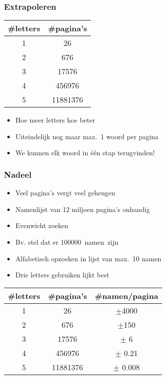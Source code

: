 \documentclass[dutch]{ucll-slides}
\begin{document}
\begin{frame}
  \frametitle{Extrapoleren}
  \begin{center}
    \begin{tabular}{cc}
      \bfseries \#letters & \bfseries \#pagina's \\
      \toprule
      1 & 26 \\
      2 & 676 \\
      3 & \SI{17576}{} \\
      4 & \SI{456976}{} \\
      5 & \SI{11881376}{} \\
    \end{tabular}
  \end{center}
  \begin{itemize}
    \item Hoe meer letters hoe beter
    \item Uiteindelijk nog maar max.~1 woord per pagina
    \item We kunnen elk woord in \'e\'en stap terugvinden!
  \end{itemize}
\end{frame}

\begin{frame}
  \frametitle{Nadeel}
  \begin{itemize}
    \item Veel pagina's vergt veel geheugen
    \item Namenlijst van 12 miljoen pagina's onhandig
    \item Evenwicht zoeken
    \item Bv. stel dat er \SI{100000} namen zijn
    \item Alfabetisch opzoeken in lijst van max.\ 10 namen
    \item Drie letters gebruiken lijkt best
  \end{itemize}
  \begin{center}
    \begin{tabular}{ccc}
      \bfseries\#letters & \bfseries\#pagina's & \bfseries\#namen/pagina \\
      \toprule
      1 & 26 & $\pm$4000 \\
      2 & 676 & $\pm$150 \\
      \color{red} 3 & \color{red} \SI{17576}{} & \color{red} $\pm$ 6 \\
      4 & \SI{456976}{} & $\pm$ 0.21 \\
      5 & \SI{11881376}{} & $\pm$ 0.008 \\
    \end{tabular}
  \end{center}
\end{frame}
\end{document}
